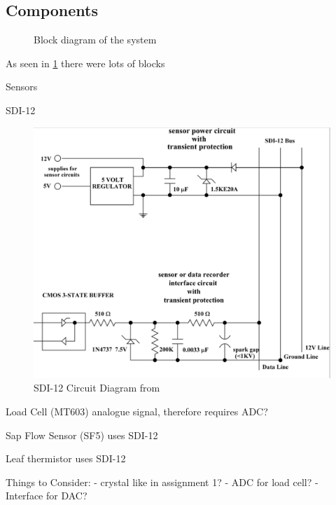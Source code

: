 \subsection{Components}


\begin{figure}
    \begin{center}
    
    \end{center}
    \caption{Block diagram of the system}
    \label{block_diagram}
\end{figure}

As seen in \cref{block_diagram} there were lots of blocks


Sensors

SDI-12

\begin{figure}
    \includegraphics[width=\linewidth]{figures/SDI-12 circuit.png}
    \caption{SDI-12 Circuit Diagram from \cite{sdi12_datasheet}}
    \label{sdi12_circuit}
\end{figure}

Load Cell (MT603)
analogue signal, therefore requires ADC?

Sap Flow Sensor (SF5)
uses SDI-12

Leaf thermistor
uses SDI-12

Things to Consider:
- crystal like in assignment 1?
- ADC for load cell?
- Interface for DAC?